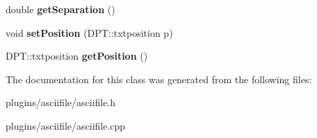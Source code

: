 \begin{DoxyCompactItemize}
\item 
\hypertarget{classtextBox_aff1679ab0955a31df29d81d9b36c3333}{double {\bfseries get\-Separation} ()}\label{classtextBox_aff1679ab0955a31df29d81d9b36c3333}

\item 
\hypertarget{classtextBox_a69307cccd8ef2da14470d8d589c3c325}{void {\bfseries set\-Position} (D\-P\-T\-::txtposition p)}\label{classtextBox_a69307cccd8ef2da14470d8d589c3c325}

\item 
\hypertarget{classtextBox_a69a4e286b20b5b842f96f45b013ad88b}{D\-P\-T\-::txtposition {\bfseries get\-Position} ()}\label{classtextBox_a69a4e286b20b5b842f96f45b013ad88b}

\end{DoxyCompactItemize}


The documentation for this class was generated from the following files\-:\begin{DoxyCompactItemize}
\item 
plugins/asciifile/asciifile.\-h\item 
plugins/asciifile/asciifile.\-cpp\end{DoxyCompactItemize}
